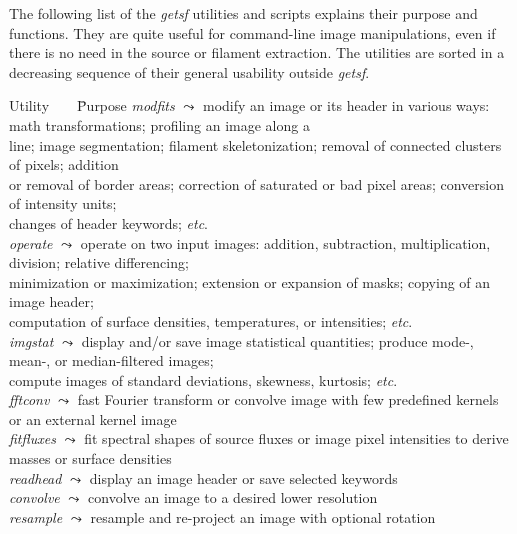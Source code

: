 \documentclass[a4paper,10pt]{article}
\begin{document}
The following list of the \textsl{getsf} utilities and scripts explains their purpose and functions. They are quite useful for
command-line image manipulations, even if there is no need in the source or filament extraction. The utilities are sorted in a
decreasing sequence of their general usability outside \textsl{getsf}.
\begin{tabbing} %
Utility \,\,\,\,\,\,\,\, \= Purpose \kill
\textsl{modfits}   \> $\leadsto$ modify an image or its header in various ways: math transformations; profiling an image along a\\
                   \> \;\;\:\: line; image segmentation; filament skeletonization; removal of connected clusters of pixels; addition\\
                   \> \;\;\:\: or removal of border areas; correction of saturated or bad pixel areas; conversion of intensity units;\\
                   \> \;\;\:\: changes of header keywords; \emph{etc}.\\
\textsl{operate}   \> $\leadsto$ operate on two input images: addition, subtraction, multiplication, division; relative differencing;\\
                   \> \;\;\:\: minimization or maximization; extension or expansion of masks; copying of an image header;\\
                   \> \;\;\:\: computation of surface densities, temperatures, or intensities; \emph{etc}.\\
\textsl{imgstat}   \> $\leadsto$ display and/or save image statistical quantities; produce mode-, mean-, or median-filtered images;\\
                   \> \;\;\:\: compute images of standard deviations, skewness, kurtosis; \emph{etc}.\\
\textsl{fftconv}   \> $\leadsto$ fast Fourier transform or convolve image with few predefined kernels or an external kernel image\\
\textsl{fitfluxes} \> $\leadsto$ fit spectral shapes of source fluxes or image pixel intensities to derive masses or surface densities\\
\textsl{readhead}  \> $\leadsto$ display an image header or save selected keywords\\
\textsl{convolve}  \> $\leadsto$ convolve an image to a desired lower resolution\\
\textsl{resample}  \> $\leadsto$ resample and re-project an image with optional rotation\\

\end{tabbing}
\end{document}
